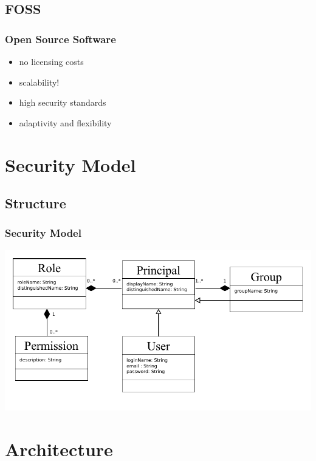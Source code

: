 \documentclass{beamer}
\begin{document}
\subsection{FOSS}
\begin{frame}
	\frametitle{Open Source Software}
	\begin{tcolorbox}[title=Why use FOSS components?]
		\begin{itemize}
			\item no licensing costs
			\item scalability!
			\item high security standards
			\item adaptivity and flexibility
		\end{itemize}
	\end{tcolorbox}
\end{frame}

\section{Security Model}
\subsection{Structure}
\begin{frame}
	\frametitle{Security Model}
	\includegraphics[width=\textwidth]{klassendiagramm.pdf}
\end{frame}

\section{Architecture}
\end{document}
